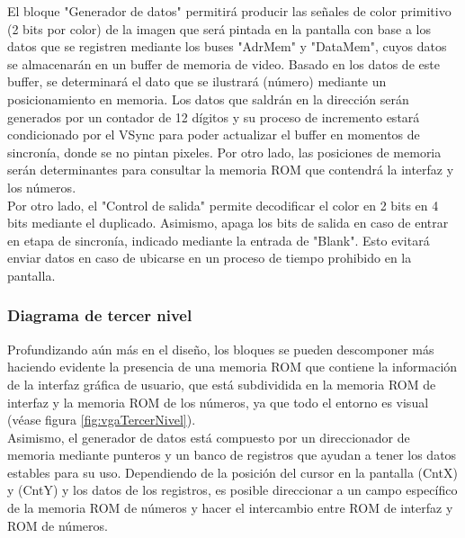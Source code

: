 \documentclass[12pt,a4paper]{article}
\begin{document}
		El bloque "Generador de datos" permitirá producir las señales de color primitivo (2 bits por color) de la imagen que será pintada en la pantalla con base a los datos que se registren mediante los buses "AdrMem" y "DataMem", cuyos datos se almacenarán en un buffer de memoria de video. Basado en los datos de este buffer, se determinará el dato que se ilustrará (número) mediante un posicionamiento en memoria. Los datos que saldrán en la dirección serán generados por un contador de 12 dígitos y su proceso de incremento estará condicionado por el VSync para poder actualizar el buffer en momentos de sincronía, donde se no pintan pixeles. Por otro lado, las posiciones de memoria serán determinantes para consultar la memoria ROM que contendrá la interfaz y los números. \\[2ex]
		Por otro lado, el "Control de salida" permite decodificar el color en 2 bits en 4 bits mediante el duplicado. Asimismo, apaga los bits de salida en caso de entrar en etapa de sincronía, indicado mediante la entrada de "Blank". Esto evitará enviar datos en caso de ubicarse en un proceso de tiempo prohibido en la pantalla. \\[2ex]
		
		
		\subsubsection{Diagrama de tercer nivel}
		Profundizando aún más en el diseño, los bloques se pueden descomponer más haciendo evidente la presencia de una memoria ROM que contiene la información de la interfaz gráfica de usuario, que está subdividida en la memoria ROM de interfaz y la memoria ROM de los números, ya que todo el entorno es visual (véase figura \ref{fig:vgaTercerNivel}).\\[2ex]
		Asimismo, el generador de datos está compuesto por un direccionador de memoria mediante punteros y un banco de registros que ayudan a tener los datos estables para su uso. Dependiendo de la posición del cursor en la pantalla (CntX) y (CntY) y los datos de los registros, es posible direccionar a un campo específico de la memoria ROM de números y hacer el intercambio entre ROM de interfaz y ROM de números.\\[2ex]
		
\end{document}
